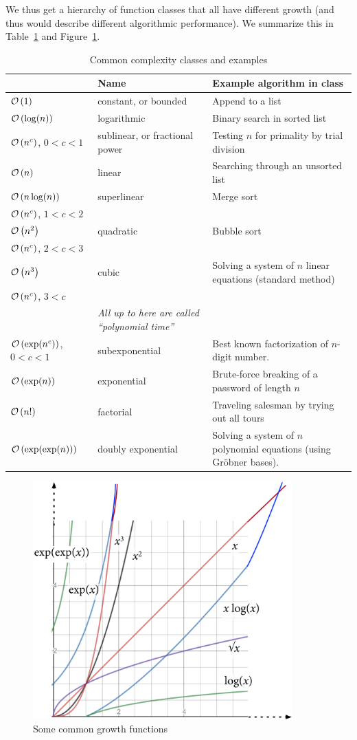We thus get a hierarchy of function classes that all have different growth
(and thus would describe different algorithmic performance).
We summarize this in Table~\ref{tabcomplcla} and Figure~\ref{figcomcl}.
\begin{table}
\begin{tabular}{p{24mm}|p{30mm}|p{40mm}}
&Name&Example algorithm in class\\
\hline
${\mathcal O}\/\left(1\right)$&constant, or bounded&Append to a list\\
${\mathcal O}\/\left(\log(n)\right)$&logarithmic&Binary search in sorted list\\
${\mathcal O}\/\left(n^c\right)$, $0<c<1$&sublinear, or fractional power&Testing $n$ for primality by trial division\\
${\mathcal O}\/\left(n\right)$&linear&Searching through an unsorted list\\
${\mathcal O}\/\left(n\log(n)\right)$&superlinear&Merge sort\\
${\mathcal O}\/\left(n^c\right)$, $1<c<2$&&\\
${\mathcal O}\/\left(n^2\right)$&quadratic&Bubble sort\\
${\mathcal O}\/\left(n^c\right)$, $2<c<3$&&\\
${\mathcal O}\/\left(n^3\right)$&cubic&Solving a system of $n$ linear equations (standard
method)\\
${\mathcal O}\/\left(n^c\right)$, $3<c$&&\\
&{\em All up to here are called ``polynomial time''}&\\
${\mathcal O}\/\left(\exp(n^c)\right)$, $0<c<1$&subexponential&Best known factorization of
$n$-digit number.\\
${\mathcal O}\/\left(\exp(n)\right)$&exponential&Brute-force breaking of a password of length $n$\\
${\mathcal O}\/\left(n!\right)$&factorial&Traveling salesman by trying out all tours\\
${\mathcal O}\/\left(\exp(\exp(n))\right)$&doubly exponential&Solving a system of $n$ polynomial equations (using Gr\"obner bases).
\end{tabular}
\caption{Common complexity classes and examples}
\label{tabcomplcla}
\end{table}
\begin{figure}
\begin{center}
\includegraphics[width=10cm]{pic/GrowthOrders.pdf}
\end{center}
\caption{Some common growth functions}
\label{figcomcl}
\end{figure}

